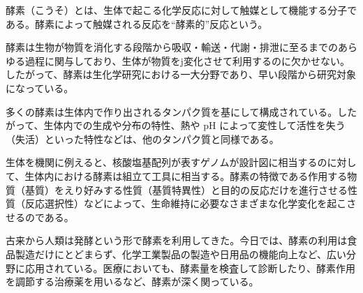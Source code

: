 \documentclass{ltjtarticle}
\begin{document}
酵素（こうそ）とは、生体で起こる化学反応に対して触媒として機能する分子である。酵素によって触媒される反応を“酵素的”反応という。

酵素は生物が物質を消化する段階から吸収・輸送・代謝・排泄に至るまでのあらゆる過程に関与しており、生体が物質をj変化させて利用するのに欠かせない。したがって、酵素は生化学研究における一大分野であり、早い段階から研究対象になっている。

多くの酵素は生体内で作り出されるタンパク質を基にして構成されている。したがって、生体内での生成や分布の特性、熱や pH によって変性して活性を失う（失活）といった特性などは、他のタンパク質と同様である。

生体を機関に例えると、核酸塩基配列が表すゲノムが設計図に相当するのに対して、生体内における酵素は組立て工具に相当する。酵素の特徴である作用する物質（基質）をえり好みする性質（基質特異性）と目的の反応だけを進行させる性質（反応選択性）などによって、生命維持に必要なさまざまな化学変化を起こさせるのである。

古来から人類は発酵という形で酵素を利用してきた。今日では、酵素の利用は食品製造だけにとどまらず、化学工業製品の製造や日用品の機能向上など、広い分野に応用されている。医療においても、酵素量を検査して診断したり、酵素作用を調節する治療薬を用いるなど、酵素が深く関っている。
\end{document}
